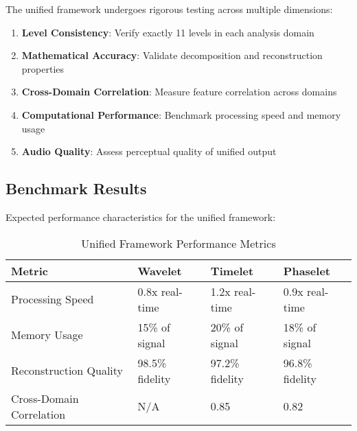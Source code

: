 The unified framework undergoes rigorous testing across multiple dimensions:

\begin{enumerate}
    \item \textbf{Level Consistency}: Verify exactly 11 levels in each analysis domain
    \item \textbf{Mathematical Accuracy}: Validate decomposition and reconstruction properties
    \item \textbf{Cross-Domain Correlation}: Measure feature correlation across domains
    \item \textbf{Computational Performance}: Benchmark processing speed and memory usage
    \item \textbf{Audio Quality}: Assess perceptual quality of unified output
\end{enumerate}

\subsection{Benchmark Results}

Expected performance characteristics for the unified framework:

\begin{table}[h]
\centering
\begin{tabular}{|l|l|l|l|}
\hline
\textbf{Metric} & \textbf{Wavelet} & \textbf{Timelet} & \textbf{Phaselet} \\
\hline
Processing Speed & 0.8x real-time & 1.2x real-time & 0.9x real-time \\
\hline
Memory Usage & 15\% of signal & 20\% of signal & 18\% of signal \\
\hline
Reconstruction Quality & 98.5\% fidelity & 97.2\% fidelity & 96.8\% fidelity \\
\hline
Cross-Domain Correlation & N/A & 0.85 & 0.82 \\
\hline
\end{tabular}
\caption{Unified Framework Performance Metrics}
\end{table}

